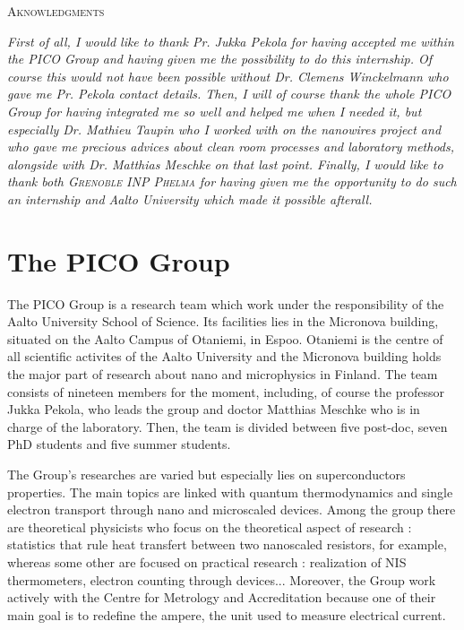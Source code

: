 \begin{center}
{\Large \textsc{Aknowledgments}}
\vspace{0.5cm}

\textit{First of all, I would like to thank Pr. Jukka Pekola for having accepted me within the PICO Group and having given me the possibility to do this internship. Of course this would not have been possible without Dr. Clemens Winckelmann who gave me Pr. Pekola contact details. Then, I will of course thank the whole PICO Group for having integrated me so well and helped me when I needed it, but especially Dr. Mathieu Taupin who I worked with on the nanowires project and who gave me precious advices about clean room processes and laboratory methods, alongside with Dr. Matthias Meschke on that last point. Finally, I would like to thank both \textsc{Grenoble INP Phelma} for having given me the opportunity to do such an internship and Aalto University which made it possible afterall.}
\end{center}
\newpage

\section*{The PICO Group}

\indent The PICO Group is a research team which work under the responsibility of the Aalto University School of Science. Its facilities lies in the Micronova building, situated on the Aalto Campus of Otaniemi, in Espoo. Otaniemi is the centre of all scientific activites of the Aalto University and the Micronova building holds the major part of research about nano and microphysics in Finland. The team consists of nineteen members for the moment, including, of course the professor Jukka Pekola, who leads the group and doctor Matthias Meschke who is in charge of the laboratory. Then, the team is divided between five post-doc, seven PhD students and five summer students. 

The Group's researches are varied but especially lies on superconductors properties. The main topics are linked with quantum thermodynamics and single electron transport through nano and microscaled devices. Among the group there are theoretical physicists who focus on the theoretical aspect of research : statistics that rule heat transfert between two nanoscaled resistors\cite{statistics}, for example, whereas some other are focused on practical research : realization of NIS thermometers, electron counting through devices... Moreover, the Group work actively with the Centre for Metrology and Accreditation because one of their main goal is to redefine the ampere, the unit used to measure electrical current\cite{ampere}.

